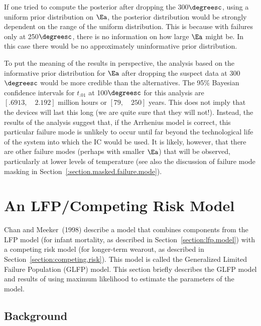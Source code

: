 If one tried to compute the posterior after dropping the
300$\degreesc$, using a uniform prior distribution on $\Ea$, the
posterior distribution would be strongly dependent on the range of
the uniform distribution.  This is because with failures only at
250$\degreesc$, there is no information on how large $\Ea$ might
be. In this case there would  be no approximately uninformative prior
distribution.

To put the meaning of the results in perspective, the analysis
based on the informative prior distribution for $\Ea$ after dropping
the suspect data at 300$\degreesc$ would be more credible than the
alternatives. The 95\% Bayesian confidence intervals for $t_{.01}$
at 100$\degreesc$ for this analysis are $[.6913, \quad 2.192]$
million hours or $[79, \quad 250]$ years. This does not imply that
the devices will last this long (we are quite sure that they will
not!). Instead, the results of the analysis suggest that, if the
Arrhenius model is correct, this particular failure mode is unlikely
to occur until far beyond the technological life of the system into
which the IC would be used. It is likely, however, that there are
other failure modes (perhaps with smaller $\Ea$) that will be
observed, particularly at lower levels of temperature (see also the
discussion of failure mode masking in
Section~\ref{:section.masked.failure.mode}).

\section{An LFP/Competing Risk Model}
\label{section:crisk.mixture.model}

Chan and Meeker~(1998) describe a model that combines components
from the LFP model (for infant mortality, as described in
Section~\ref{section:lfp.model}) with a competing risk model (for
longer-term wearout, as described in
Section~\ref{section:competing.risk}).  This model is called the
Generalized Limited Failure Population (GLFP) model.  This section
briefly describes the GLFP model and results of using maximum likelihood
to estimate the parameters of the model.

\subsection{Background}

